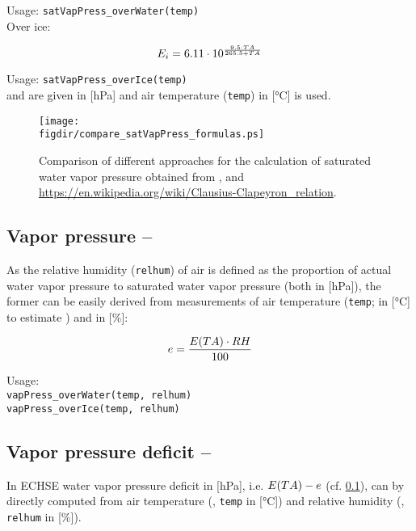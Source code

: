 \noindent
Usage:
\verb!satVapPress_overWater(temp)!\\

\noindent
Over ice:

\begin{equation} \label{eqn:meteo:satVapPressIce}
E_i{} = 6.11 \cdot 10^{\frac{9.5 \cdot TA{}}{265.5 + TA{}}}
\end{equation}

\noindent
Usage:
\verb!satVapPress_overIce(temp)!\\

\satVaporPressureWater{} and \satVaporPressureIce{} are given in [\si{\hecto\pascal}] and air temperature \airtemp{} (\verb!temp!) in [\si{\degreeCelsius}] is used.

\begin{figure}
  \centering
  \texttt{[image: \\figdir/compare\_satVapPress\_formulas.ps]}
  \caption{Comparison of different approaches for the calculation of saturated water vapor pressure obtained from \citet{Dyck1995, Neitsch2011}, and \url{https://en.wikipedia.org/wiki/Clausius-Clapeyron_relation}. \label{fig:meteo:satVapPress}}
\end{figure}


\subsection{Vapor pressure -- \vaporPressure} \label{sec:meteo:vappress}
As the relative humidity \relHumidity{} (\verb!relhum!) of air is defined as the proportion of actual water vapor pressure \vaporPressure{} to saturated water vapor pressure \satVaporPressure{} (both in [\si{\hecto\pascal}]), the former can be easily derived from measurements of air temperature \airtemp{} (\verb!temp!; in [\si{\degreeCelsius}] to estimate \satVaporPressure{}) and \relHumidity{} in [\si{\percent}]:

\begin{equation} \label{eqn:meteo:vapPress}
e{} = \frac{E{(TA{})} \cdot RH{}}{100}
\end{equation}

\noindent
Usage:\\
\verb!vapPress_overWater(temp, relhum)!\\
\verb!vapPress_overIce(temp, relhum)!


\subsection{Vapor pressure deficit -- \vaporPressureDeficit} \label{sec:meteo:vappressdef}
In ECHSE water vapor pressure deficit in [\si{\hecto\pascal}], i.e. $E{(TA{})} - e{}$ (cf.  \ref{sec:meteo:vappress}), can by directly computed from air temperature (\airtemp{}, \verb!temp! in [\si{\degreeCelsius}]) and relative humidity (\relHumidity{}, \verb!relhum! in [\si{\percent}]).

